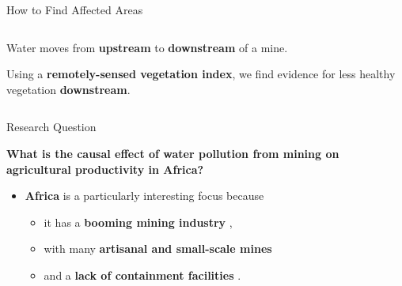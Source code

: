 \documentclass[aspectratio=169,11pt,dvipsnames, handout]{beamer}
\begin{document}
\begin{frame}{How to Find Affected Areas}
\begin{columns}
\begin{column}{0.65\linewidth}
            Water moves from \colorbox{upcol!30}{\bfseries upstream} to \colorbox{downcol!30}{\bfseries downstream} of a mine.

            \vspace{1em}
        
            Using a \textbf{remotely-sensed vegetation index}, we find evidence for less healthy vegetation \colorbox{downcol!30}{\bfseries downstream}.

            \vspace{1em}\flushright

            \hyperlink{frame:appintro}{}
            \hyperlink{frame:appbasins}{}
        \end{column}
    \end{columns}
\end{frame}



\begin{frame}{Research Question}

\begin{tcolorbox}[colback=secondclr!20, colframe=secondclr!20, fontupper=\bfseries\color{secondclr!40!black}, width=\textwidth, sharp corners, boxrule=0pt, halign=center]
\bfseries What is the causal effect of water pollution from mining on agricultural productivity in Africa?
\end{tcolorbox}

\vspace{1em}

    \begin{itemize}
        \item \textbf{Africa} is a particularly interesting focus because
        \vspace{0.5em}
        \begin{itemize}
            \item it has a \textbf{booming mining industry} \parencite{icmm2022},
            \vspace{0.25em}
            \item with many \textbf{artisanal and small-scale mines} \parencite{asm2022, girard2022}
            \vspace{0.25em}
            \item and a \textbf{lack of containment facilities} \parencite{kossoff2014, macklin2023}.
        \end{itemize}
    \end{itemize}
\end{frame}
\end{document}
